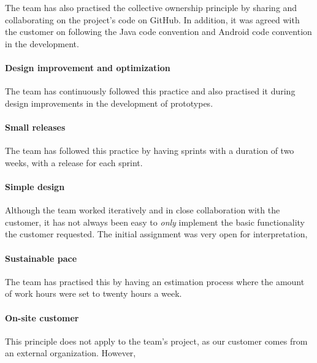 The team has also practised the collective ownership principle by sharing and collaborating on the project's code on GitHub. In addition, it was agreed with the customer on following the Java code convention and Android code convention in the development.

\paragraph{Design improvement and optimization}
The team has continuously followed this practice and also practised it during design improvements in the development of prototypes.
 
\paragraph{Small releases}
The team has followed this practice by having sprints with a duration of two weeks, with a release for each sprint.


\paragraph{Simple design}
Although the team worked iteratively and in close collaboration with the customer, it has not always been easy to \emph{only} implement the basic functionality the customer requested. The initial assignment was very open for interpretation,  

\paragraph{Sustainable pace}
The team has practised this by having an estimation process where the amount of work hours were set to twenty hours a week.

\paragraph{On-site customer}
This principle does not apply to the team's project, as our customer comes from an external organization. However,

